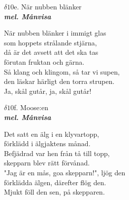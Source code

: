 \documentclass[a6paper,10pt]{article}
\newcommand{\mel}[1]{\small\textbf{\textit{mel. #1 \\}}}
\begin{document}
\begin{center}
\Large $\delta10$e. När nubben blänker\\ 
\mel{Månvisa}
\end{center}
När nubben blänker i immigt glas \\
som hoppets strålande stjärna, \\
då är det avsett att det ska tas \\
förutan fruktan och gärna. \\
Så klang och klingom, så tar vi supen, \\
den läskar härligt den torra strupen. \\
Ja, skål gutår, ja, skål gutår! 

\begin{center}
\Large $\delta10$f. Moose:en\\ 
\mel{Månvisa}
\end{center}
Det satt en älg i en klyvartopp,\\
förklädd i älgjaktens månad.\\
Befjädrad var hen från tå till topp,\\
skepparn blev rätt förvånad.\\
"Jag är en mås, goa skepparn!", ljög den\\
förklädda älgen, därefter flög den.\\
Mjukt föll den sen, på skepparen.
\end{document}
